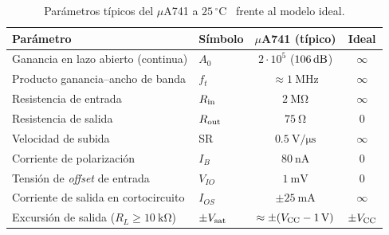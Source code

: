 

\begin{table}[ht]
\centering\small
\renewcommand{\arraystretch}{1.2}
\caption{Parámetros típicos del $\mu$A741 a $25\,^{\circ}\mathrm{C}$~\cite{UA741} frente al modelo ideal.}
\label{tab:741}
\begin{tabular}{@{}llcc@{}}
\toprule
Parámetro & Símbolo & $\mu$A741 (típico) & Ideal\\
\midrule
Ganancia en lazo abierto (continua) & $A_0$ & $2\cdot10^{5}$ ($106\,\mathrm{dB}$) & $\infty$\\
Producto ganancia--ancho de banda & $f_t$ & $\approx\SI{1}{\mega\hertz}$ & $\infty$\\
Resistencia de entrada & $R_{\mathrm{in}}$ & $\SI{2}{\mega\ohm}$ & $\infty$\\
Resistencia de salida & $R_{\mathrm{out}}$ & $\SI{75}{\ohm}$ & $0$\\
Velocidad de subida & SR & $\SI{0.5}{\volt\per\micro\second}$ & $\infty$\\
Corriente de polarización & $I_B$ & $\SI{80}{\nano\ampere}$ & $0$\\
Tensión de \emph{offset} de entrada & $V_{IO}$ & $\SI{1}{\milli\volt}$ & $0$\\
Corriente de salida en cortocircuito & $I_{OS}$ & $\pm\SI{25}{\milli\ampere}$ & $\infty$\\
Excursión de salida ($R_L\ge\SI{10}{\kilo\ohm}$) & $\pm V_{\mathrm{sat}}$ & $\approx\pm(V_{\mathrm{CC}}-1\,\mathrm{V})$ & $\pm V_{\mathrm{CC}}$\\
\bottomrule
\end{tabular}
\end{table}
